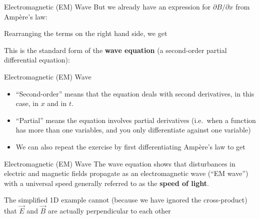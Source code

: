 \documentclass[12pt,aspectratio=169]{beamer}
\begin{document}
\begin{frame}{Electromagnetic (EM) Wave}
  But we already have an expression for $\partial B/\partial x$ from
  Amp\`{e}re's law:


  Rearranging the terms on the right hand side, we get

  
  This is the standard form of the \textbf{wave equation} (a second-order
  partial differential equation):

\end{frame}



\begin{frame}{Electromagnetic (EM) Wave}
  \begin{itemize}
  \item ``Second-order'' means that the equation deals with second derivatives,
    in this case, in $x$ and in $t$.
  \item ``Partial'' means the equation involves partial derivatives (i.e.\
    when a function has more than one variables, and you only differentiate
    against one variable)
  \item We can also repeat the exercise by first differentiating Amp\`{e}re's
    law to get

  \end{itemize}
\end{frame}



\begin{frame}{Electromagnetic (EM) Wave}
  The wave equation shows that disturbances in electric and magnetic fields
  propagate as an electromagnetic wave (``EM wave'') with a universal speed
  generally referred to as the \textbf{speed of light}.

  \eq{-.1in}{
    v=c_0=\frac1{\sqrt{\mu_0\varepsilon_0}}=\SI{299792458}{\metre\per\second}
  }

  The simplified 1D example cannot (because we have ignored the cross-product)
  that $\vec E$ and $\vec B$ are actually perpendicular to each other
\end{frame}
\end{document}
